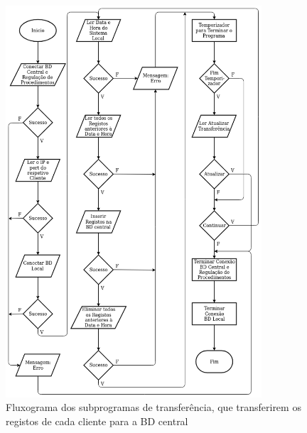 \documentclass[11pt,twoside,a4paper]{report}
\begin{document}
\begin{figure}[H]
	\begin{center}
		\includegraphics[width=0.85\textwidth]{fluxograma_transferencia_subprograma4} %
		\caption[Fluxograma dos subprogramas de transferência]{Fluxograma dos subprogramas de transferência, que transferirem os registos de cada cliente para a BD central}
		\label{fig:transferencia_subprograma}
	\end{center}
\end{figure}
\end{document}
